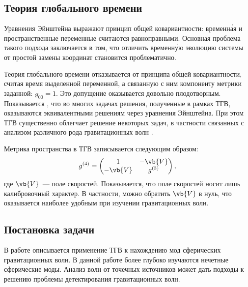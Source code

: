 \documentclass[\docroot/reports/draft/report.tex]{subfiles}
\begin{document}
\onlyinsubfile{\tableofcontents}

\subsection{Теория глобального времени\label{sec:tgt}}

    

    Уравнения Эйнштейна выражают принцип общей ковариантности: временн\'{а}я и пространственные переменные считаются равноправными. Основная проблема такого подхода заключается в том, что отличить временн\'{у}ю эволюцию системы от простой замены координат становится проблематично.

    Теория глобального времени отказывается от принципа общей ковариантности, считая время выделенной переменной, а связанную с ним компоненту метрики заданной: $g_{00} = 1$. Это допущение оказывается довольно плодотворным. Показывается \cite{burlankov_space_dynamics,burlankov_grav_waves}, что во многих задачах решения, полученные в рамках ТГВ, оказываются эквивалентными решениям через уравнения Эйнштейна. При этом ТГВ существенно облегчает решение некоторых задач, в частности связанных с анализом различного рода гравитационных волн \cite{burlankov_grav_waves}.

    Метрика пространства в ТГВ записывается следующим образом:
    \begin{equation*}
        g^{(4)} = \begin{pmatrix}
            1       & -\vb{V} \\
            -\vb{V} & g^{(3)}
        \end{pmatrix},
    \end{equation*}
    где $\vb{V}$~--- поле скоростей. Показывается, что поле скоростей носит лишь калибровочный характер. В частности, можно обратить $\vb{V}$ в нуль, что оказывается наиболее удобным при изучении гравитационных волн.

\subsection{Постановка задачи}

    В работе \cite{burlankov_grav_waves} описывается применение ТГВ к нахождению мод сферических гравитационных волн. В данной работе более глубоко изучаются нечетные сферические моды. Анализ волн от точечных источников может дать подходы к решению проблемы детектирования гравитационных волн.

\end{document}
